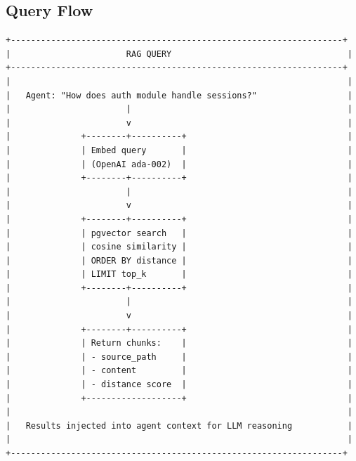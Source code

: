 \documentclass[11pt,a4paper]{article}
\begin{document}
\subsection{Query Flow}

\begin{verbatim}
+------------------------------------------------------------------+
|                       RAG QUERY                                   |
+------------------------------------------------------------------+
|                                                                   |
|   Agent: "How does auth module handle sessions?"                  |
|                       |                                           |
|                       v                                           |
|              +--------+----------+                                |
|              | Embed query       |                                |
|              | (OpenAI ada-002)  |                                |
|              +--------+----------+                                |
|                       |                                           |
|                       v                                           |
|              +--------+----------+                                |
|              | pgvector search   |                                |
|              | cosine similarity |                                |
|              | ORDER BY distance |                                |
|              | LIMIT top_k       |                                |
|              +--------+----------+                                |
|                       |                                           |
|                       v                                           |
|              +--------+----------+                                |
|              | Return chunks:    |                                |
|              | - source_path     |                                |
|              | - content         |                                |
|              | - distance score  |                                |
|              +-------------------+                                |
|                                                                   |
|   Results injected into agent context for LLM reasoning           |
|                                                                   |
+------------------------------------------------------------------+
\end{verbatim}

\end{document}
